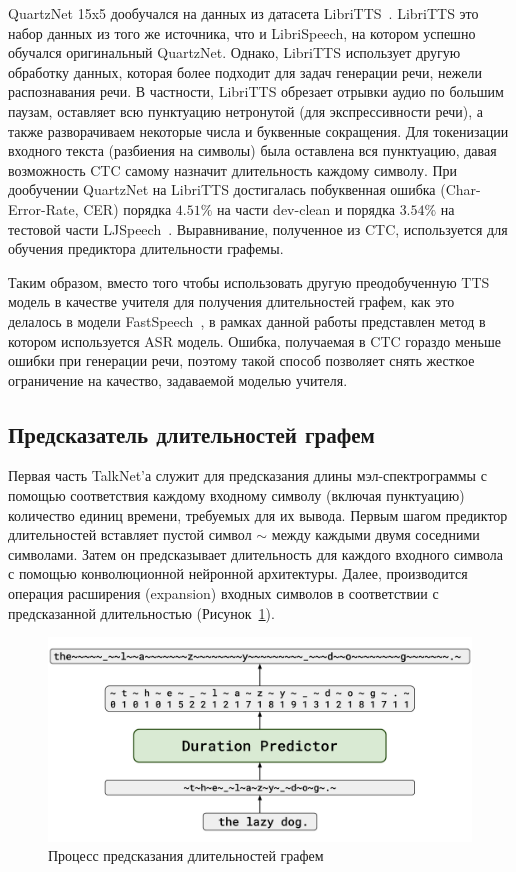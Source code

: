 QuartzNet 15x5 дообучался на данных из датасета LibriTTS~\cite{libritts}. LibriTTS это набор данных из того же источника, что и LibriSpeech, на котором успешно обучался оригинальный QuartzNet. Однако, LibriTTS использует другую обработку данных, которая более подходит для задач генерации речи, нежели распознавания речи. В частности, LibriTTS обрезает отрывки аудио по большим паузам, оставляет всю пунктуацию нетронутой (для экспрессивности речи), а также разворачиваем некоторые числа и буквенные сокращения. Для токенизации входного текста (разбиения на символы) была оставлена вся пунктуацию, давая возможность CTC самому назначит длительность каждому символу. При дообучении QuartzNet на LibriTTS достигалась побуквенная ошибка (Char-Error-Rate, CER) порядка $4.51\%$ на части dev-clean и порядка $3.54\%$ на тестовой части LJSpeech~\cite{ljspeech}. Выравнивание, полученное из CTC, используется для обучения предиктора длительности графемы.

Таким образом, вместо того чтобы использовать другую преодобученную TTS модель в качестве учителя для получения длительностей графем, как это делалось в модели FastSpeech~\cite{fastspeech}, в рамках данной работы представлен метод в котором используется ASR модель. Ошибка, получаемая в CTC гораздо меньше ошибки при генерации речи, поэтому такой способ позволяет снять жесткое ограничение на качество, задаваемой моделью учителя.

\subsection{Предсказатель длительностей графем}

Первая часть TalkNet'а служит для предсказания длины мэл-спектрограммы с помощью соответствия каждому входному символу (включая пунктуацию) количество единиц времени, требуемых для их вывода. Первым шагом предиктор длительностей вставляет пустой символ $\sim$ между каждыми двумя соседними символами. Затем он предсказывает длительность для каждого входного символа с помощью конволюционной нейронной архитектуры. Далее, производится операция расширения (expansion) входных символов в соответствии с предсказанной длительностью (Рисунок~\ref{fig:durs}).

\begin{figure}[!ht]
\centering
\includegraphics[width=1.0\linewidth]{images/durs.png}
\caption{Процесс предсказания длительностей графем}
\label{fig:durs}
\end{figure}

